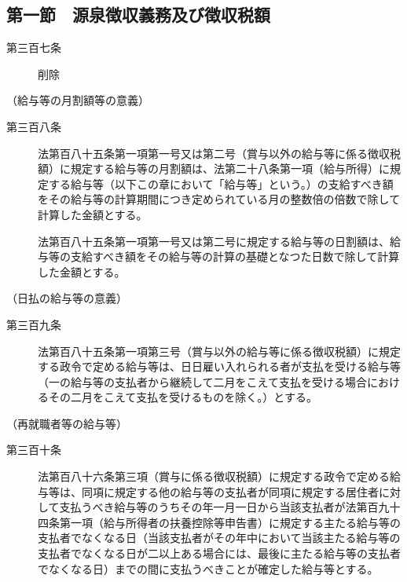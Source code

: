 \documentclass[twocolumn,a4j,10pt]{ltjtarticle}
\begin{document}
\subsection*{第一節　源泉徴収義務及び徴収税額}
\begin{description}
\item[第三百七条]削除
\end{description}
\noindent\hspace{10pt}（給与等の月割額等の意義）
\begin{description}
\item[第三百八条]法第百八十五条第一項第一号又は第二号（賞与以外の給与等に係る徴収税額）に規定する給与等の月割額は、法第二十八条第一項（給与所得）に規定する給与等（以下この章において「給与等」という。）の支給すべき額をその給与等の計算期間につき定められている月の整数倍の倍数で除して計算した金額とする。
\item[]法第百八十五条第一項第一号又は第二号に規定する給与等の日割額は、給与等の支給すべき額をその給与等の計算の基礎となつた日数で除して計算した金額とする。
\end{description}
\noindent\hspace{10pt}（日払の給与等の意義）
\begin{description}
\item[第三百九条]法第百八十五条第一項第三号（賞与以外の給与等に係る徴収税額）に規定する政令で定める給与等は、日日雇い入れられる者が支払を受ける給与等（一の給与等の支払者から継続して二月をこえて支払を受ける場合におけるその二月をこえて支払を受けるものを除く。）とする。
\end{description}
\noindent\hspace{10pt}（再就職者等の給与等）
\begin{description}
\item[第三百十条]法第百八十六条第三項（賞与に係る徴収税額）に規定する政令で定める給与等は、同項に規定する他の給与等の支払者が同項に規定する居住者に対して支払うべき給与等のうちその年一月一日から当該支払者が法第百九十四条第一項（給与所得者の扶養控除等申告書）に規定する主たる給与等の支払者でなくなる日（当該支払者がその年中において当該主たる給与等の支払者でなくなる日が二以上ある場合には、最後に主たる給与等の支払者でなくなる日）までの間に支払うべきことが確定した給与等とする。
\end{description}
\end{document}

